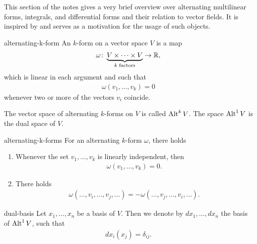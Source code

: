 \begin{intro}
  This section of the notes gives a very brief overview over
  alternating multilinear forms, integrals, and differential forms and
  their relation to vector fields. It is inspired by \cite{Hiptmair02}
  and serves as a motivation for the usage of such objects.
\end{intro}

\begin{Definition}{alternating-k-form}
  An  $k$-form on a vector space $V$ is a map
  \begin{gather}
    \omega\colon\underbrace{V\times \dots\times V}_{k \text{ factors}} \to \mathbb R,
  \end{gather}
  which is linear in each argument and such that
  \begin{gather}
    \omega(v_1,\dots,v_k) = 0
  \end{gather}
  whenever two or more of the vectors $v_i$ coincide.

  The vector space of alternating $k$-forms on $V$ is called
  $\operatorname{Alt}^k V$. The space $\operatorname{Alt}^1 V$ is the dual space of $V$.
\end{Definition}

\begin{Lemma}{alternating-k-forms}
  For an alternating $k$-form $\omega$, there holds
  \begin{enumerate}
  \item Whenever the set $v_1,\dots,v_k$ is linearly independent, then
    \begin{gather}
      \omega(v_1,\dots,v_k) = 0.
    \end{gather}
  \item There holds
    \begin{gather}
      \omega(\ldots,v_i,\ldots,v_j,\ldots) = - \omega(\ldots,v_j,\ldots,v_i,\ldots).
    \end{gather}
  \end{enumerate}
\end{Lemma}

\begin{Notation}{dual-basis}
  Let $x_1,\dots,x_n$ be a basis of $V$. Then we denote by $dx_1,\dots,dx_n$ the basis of $\operatorname{Alt}^1V$,
  such that
  \begin{gather}
    dx_i(x_j) = \delta_{ij}.
  \end{gather}
\end{Notation}


